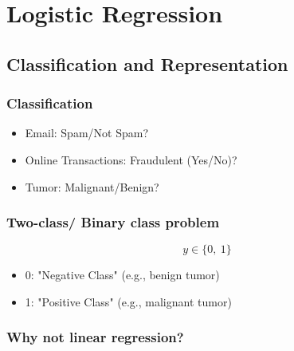 
\chapter{Logistic Regression} %

\label{ch:LogisticRegression} %

\section{Classification and Representation}
\subsection{Classification}

\begin{example}
  \quad
  \begin{itemize}
     \item Email: Spam/Not Spam?
     \item Online Transactions: Fraudulent (Yes/No)?
     \item Tumor: Malignant/Benign?
   \end{itemize}
\end{example}

\subsection{Two-class/ Binary class problem}
$$y\in \{0,\ 1\}$$
\begin{itemize}
  \item 0: "Negative Class" (e.g., benign tumor)
  \item 1: "Positive Class" (e.g., malignant tumor)
\end{itemize}

\subsection{Why not linear regression?}

